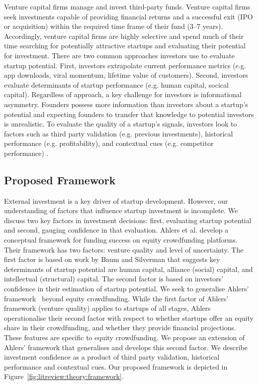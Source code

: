\documentclass[../thesis/thesis.tex]{subfiles}
\begin{document}
\begin{refsection}
Venture capital firms manage and invest third-party funds. Venture capital firms seek investments capable of providing financial returns and a successful exit (IPO or acquisition) within the required time frame of their fund (3–7 years). Accordingly, venture capital firms are highly selective and spend much of their time searching for potentially attractive startups and evaluating their potential for investment. There are two common approaches investors use to evaluate startup potential. First, investors extrapolate current performance metrics (e.g. app downloads, viral momentum, lifetime value of customers). Second, investors evaluate determinants of startup performance (e.g. human capital, socical capital). Regardless of approach, a key challenge for investors is informational asymmetry. Founders possess more information than investors about a startup's potential and expecting founders to transfer that knowledge to potential investors is unrealistic. To evaluate the quality of a startup's signals, investors look to factors such as third party validation (e.g. previous investments), historical performance (e.g. profitability), and contextual cues (e.g. competitor performance) \cite{ahlers2015,hoenen2014,hsu2008}.

\subsection{Proposed Framework}

External investment is a key driver of startup development. However, our understanding of factors that influence startup investment is incomplete. We discuss two key factors in investment decisions: first, evaluating startup potential and second, gauging confidence in that evaluation. Ahlers et al. \cite{ahlers2015} develop a conceptual framework for funding success on equity crowdfunding platforms. Their framework has two factors: venture quality and level of uncertainty. The first factor is based on work by Baum and Silverman \cite{baum2004} that suggests key determinants of startup potential are human capital, alliance (social) capital, and intellectual (structural) capital. The second factor is based on investors' confidence in their estimation of startup potential. We seek to generalise Ahlers' framework~\cite{ahlers2015} beyond equity crowdfunding. While the first factor of Ahlers' framework (venture quality) applies to startups of all stages, Ahlers operationalise their second factor with respect to whether startups offer an equity share in their crowdfunding, and whether they provide financial projections. These features are specific to equity crowdfunding. We propose an extension of Ahlers' framework that generalises and develops this second factor. We describe investment confidence as a product of third party validation, historical performance and contextual cues. Our proposed framework is depicted in Figure~\ref{fig:litreview:theory:framework}.


\end{refsection}
\end{document}

